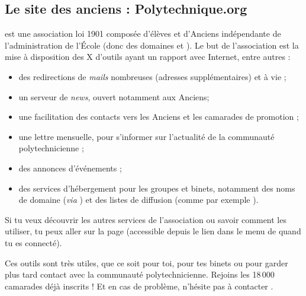 \subsection{Le site des anciens : Polytechnique.org}
 est une association loi 1901 composée d'élèves et d'Anciens
 indépendante de l'administration de l'\'Ecole (donc des domaines 
 et ). Le but de l'association est la mise à disposition des X d'outils
ayant un rapport avec Internet, entre autres :
\begin{itemize}
  \item des redirections de \emph{mails} nombreuses (adresses supplémentaires) et à vie ;
  \item un serveur de \emph{news}, ouvert notamment aux Anciens;
  \item une facilitation des contacts vers les Anciens et les camarades de promotion ;
  \item une lettre mensuelle, pour s'informer sur l'actualité de la communauté polytechnicienne ;
  \item des annonces d'événements ;
  \item des services d'hébergement pour les groupes et binets, notamment des noms de domaine (\emph{via} ) et des listes de diffusion (comme par exemple ).
\end{itemize}
Si tu veux découvrir les autres services de l'association ou savoir
comment les utiliser, tu peux aller sur la page
 (accessible depuis
le lien  dans le menu de 
quand tu es connecté).



 Ces outils sont très utiles, que
ce soit pour toi, pour tes binets ou pour garder plus tard contact avec la communauté polytechnicienne. Rejoins
les 18\,000 camarades déjà inscrits ! Et en cas de problème, n'hésite pas à contacter
.
